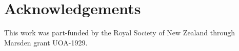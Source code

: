 \documentclass[useAMS,usenatbib,referee]{biom}
\begin{document}




\section*{Acknowledgements}

This work was part-funded by the Royal Society of New Zealand through Marsden grant UOA-1929.

%
\end{document}
